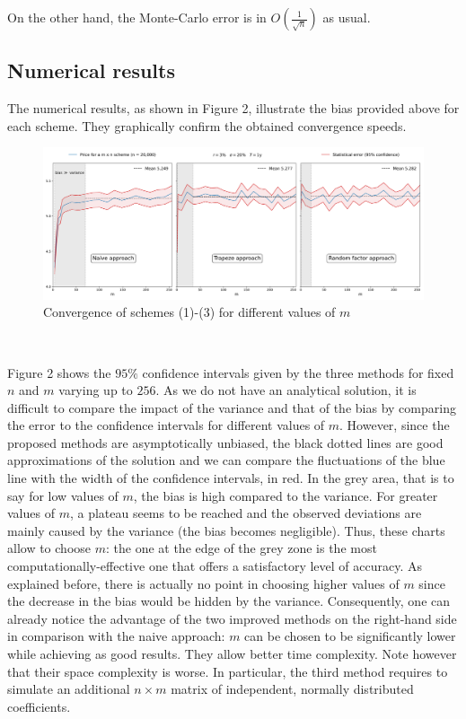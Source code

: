 \documentclass{article}
\begin{document}
\noindent On the other hand, the Monte-Carlo error is in $O \left( \frac{1}{\sqrt{n}} \right)$ as usual.

\subsection*{Numerical results}

The numerical results, as shown in Figure 2, illustrate the bias provided above for each scheme.
They graphically confirm the obtained convergence speeds.

\begin{figure}[h]
  \hspace*{-0.025\linewidth}\includegraphics[width=1.04\textwidth]{charts/cvgce_wo_control.png}
  \caption{Convergence of schemes (1)-(3) for different values of $m$}
\end{figure}

\

Figure 2 shows the $95\%$ confidence intervals given by the three methods for fixed $n$ and $m$
varying up to $256$. As we do not have an analytical solution, it is difficult to compare the impact of the variance and that
of the bias by comparing the error to the confidence intervals for different values of $m$. However, since the proposed
methods are asymptotically unbiased, the black dotted lines are good approximations of the solution and we
can compare the fluctuations of the blue line with the width of the confidence intervals, in red. In the grey area,
that is to say for low values of $m$, the bias is high compared to the variance. For greater values of $m$, a plateau
seems to be reached and the observed deviations are mainly caused by the variance (the bias becomes negligible).
Thus, these charts allow
to choose $m$: the one at the edge of the grey zone is the most computationally-effective one that offers a satisfactory
level of accuracy. As explained before, there is actually no point in choosing higher values of $m$ since the decrease in
the bias would be hidden by the variance. Consequently, one can already notice the advantage of the two improved
methods on the right-hand side in comparison with the naive approach: $m$ can be chosen to be significantly lower
while achieving as good results. They allow better time complexity. Note however that their space complexity is worse.
In particular, the third method requires to simulate an additional $n \times m$ matrix of independent, normally
distributed coefficients.
\end{document}
